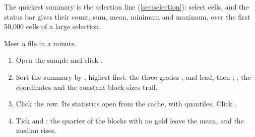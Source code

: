 The quickest summary is the selection line (\cref{sec:selection}): select cells, and the status bar gives
their count, sum, mean, minimum and maximum, over the first 50{,}000 cells of a large selection.

\begin{tryit}
Meet a file in a minute.
\begin{enumerate}
\item Open the sample and click .
\item Sort the summary by , highest first: the three grades ,  and
 lead, then ; , the coordinates and the constant block sizes
trail.
\item Click the  row. Its statistics open from the cache, with  quantiles. Click
.
\item Tick  and : the quarter of the blocks with no gold leave the mean, and
the median rises.
\end{enumerate}
\end{tryit}
